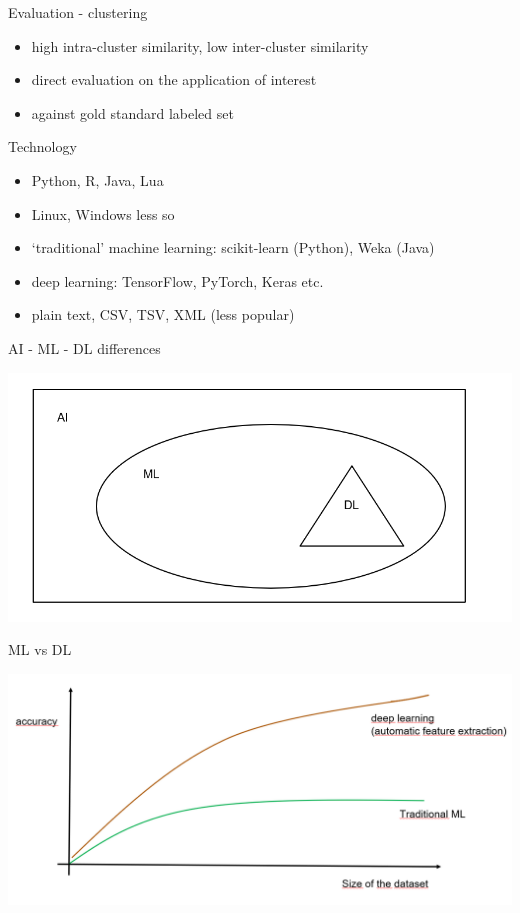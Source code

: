 \documentclass[bigger]{beamer}
\begin{document}
\begin{frame}{Evaluation - clustering}
    \begin{itemize}
        \item high intra-cluster similarity, low inter-cluster similarity
        \item direct evaluation on the application of interest
        \item against gold standard labeled set
    \end{itemize}
\end{frame}

\begin{frame}{Technology}
    \begin{itemize}
        \item Python, R, Java, Lua
        \item Linux, Windows less so
        \item `traditional' machine learning: scikit-learn (Python), Weka (Java)
        \item deep learning: TensorFlow, PyTorch, Keras etc.
        \item plain text, CSV, TSV, XML (less popular)
    \end{itemize}
\end{frame}

\begin{frame}{AI - ML - DL differences}
    \begin{center}
        \includegraphics[width=.8\textwidth]{fig/ai_ml_dl.png}
    \end{center}
\end{frame}

\begin{frame}{ML vs DL}
    \begin{center}
        \includegraphics[width=.8\textwidth]{fig/ml_dl_scale.png}
    \end{center}
\end{frame}
\end{document}
